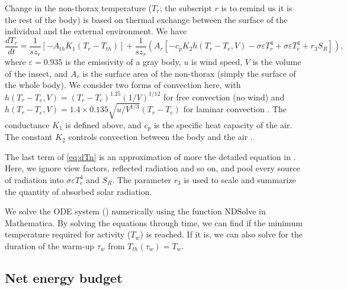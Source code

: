 Change in the  non-thorax temperature ($T_r$; the subscript $r$ is to remind us it is the rest of the body) is based on thermal exchange between the surface of the individual and the external environment.
We have
\begin{equation} \label{eq:dTn}
		\frac{dT_r}{dt} =  \frac{1}{s z_{r}} \left[ - A_{th} K_1(T_r - T_{th})  \right]
			+ \frac{1}{s z_{r}} \left( A_r \left[ - c_p K_2 h(T_r -T_e, V)- \sigma \varepsilon T_r^4 + \sigma \varepsilon T_e^4  + r_3 S_R  \right] \right),
\end{equation}
where $\varepsilon = 0.935$ is the emissivity of a gray body, $u$ is wind speed, $V$ is the volume of the insect, and $A_r$ is the surface area of the non-thorax (simply the surface of the whole body).
We consider two forms of convection here, with $ h(T_r -T_e, V) = (T_r- T_e)^{1.25} (1/V)^{1/12 }$ for free convection (no wind) and $ h(T_r -T_e, V) =  1.4 \times 0.135 \sqrt{u/V^{1/3}} (T_r- T_e) $ for laminar convection \citep{Campbell2012}.
%
The conductance $K_1$ is defined above, and $c_p$ is the specific heat capacity of the air.
The constant $K_2$ controls convection between the body and the air \citep{Campbell2012}.

The last term of \cref{eq:dTn}  is an approximation of more the detailed equation in \citet{Campbell2012}.
Here, we ignore view factors, reflected radiation and so on, and pool every source of radiation into $ \sigma \varepsilon T_e^4$ and $S_R$.
The parameter $r_3$ is used to scale and summarize the quantity of absorbed solar radiation.

We solve the ODE system () numerically using the function NDSolve in \nocite{Mathematica10} Mathematica.
By solving the equations through time, we can find if the minimum temperature  required for activity ($T_w$) is reached. %
If it is, we can also solve for the duration of the warm-up $\tau_w$ from $T_{th}(\tau_w) = T_w$.

\subsection*{Net energy budget}

